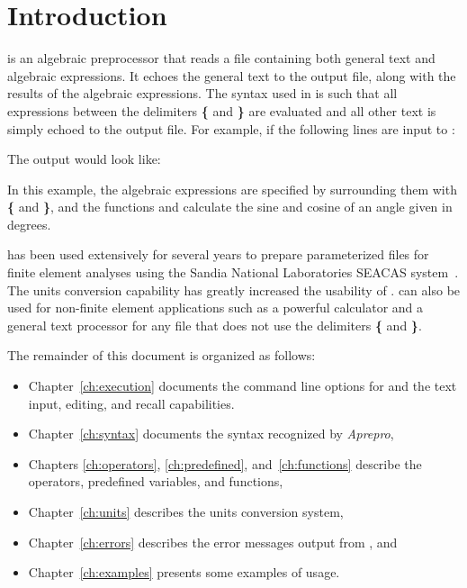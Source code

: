 \chapter{Introduction}

\aprepro{} is an algebraic preprocessor that reads a file containing both 
general text and algebraic expressions. It echoes the general text to the output 
file, along with the results of the algebraic expressions. The syntax used in \aprepro{}
is such that all expressions between the delimiters \textbf{\{} and \textbf{\}} 
are evaluated and all other text is simply echoed to the output file. For example, 
if the following lines are input to \aprepro{}:


The output would look like:


In this example, the algebraic expressions are specified by surrounding them with 
\textbf{\{} and \textbf{\}}, and the functions  and  
calculate the sine and cosine of an angle given in degrees.

\aprepro{} has been used extensively for several years to prepare parameterized 
files for finite element analyses using the Sandia National Laboratories 
SEACAS system~\cite{bib:seacas}. The units conversion capability has greatly increased the 
usability of \aprepro{}. \aprepro{} can also be used for non-finite element 
applications such as a powerful calculator and a general text processor for any 
file that does not use the delimiters \textbf{\{} and \textbf{\}}.

The remainder of this document is organized as follows:

\begin{itemize}
\item Chapter~\ref{ch:execution} documents the command line options for \aprepro{} and the text input, editing, and recall capabilities.
\item Chapter~\ref{ch:syntax} documents the syntax recognized by \textit{Aprepro}, 
\item Chapters \ref{ch:operators}, \ref{ch:predefined}, and~\ref{ch:functions} describe the operators, predefined variables, and functions, 
\item Chapter~\ref{ch:units} describes the units conversion system, 
\item Chapter~\ref{ch:errors} describes the error messages output from \aprepro{}, and 
\item Chapter~\ref{ch:examples} presents some examples of \aprepro{} usage.
\end{itemize}
